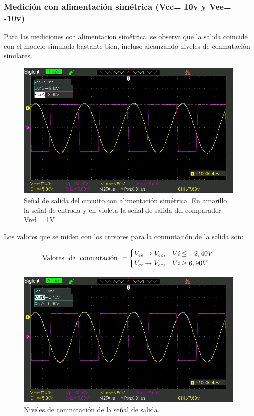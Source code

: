 \subsubsection{Medición con alimentación simétrica (Vcc= 10v y Vee= -10v)}
Para las mediciones con alimentacion simétrica, se observa que la salida coincide con el modelo simulado bastante bien, incluso alcanzando niveles de conmutación similares.

\begin{figure}[H]
    \centering
    \includegraphics[width=0.75\linewidth]{Secciones/Circuito4/SDS00001.jpg}
    \caption{Señal de salida del circuito con alimentación simétrica. En amarillo la señal de entrada y en violeta la señal de salida del comparador. Vref = 1V}
    \label{fig:enter-label}
\end{figure}

Los valores que se miden con los cursores para la conmutación de la salida son:

\begin{equation}
    \text{Valores \space de \space conmutación \space =}
    \begin{cases}
      V_{ee} \rightarrow V_{cc}, &  Vi\leq-2,40V \\
      V_{cc} \rightarrow V_{ee}, &  Vi\geq6,90V
    \end{cases}
  \end{equation}

\begin{figure}[H]
    \centering
    \includegraphics[width=0.75\linewidth]{Secciones/Circuito4/SDS00002.jpg}
    \caption{Niveles de conmutación de la señal de salida.}
    \label{fig:enter-label}
\end{figure}


